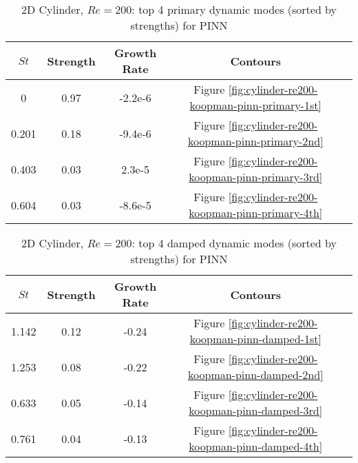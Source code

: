 \begin{table}[hbt!]
    \begin{threeparttable}[b]
        \begin{tabular}{ccccc}
            \toprule
            $St$ & Strength & Growth Rate & Contours \\
            \midrule
            0     & 0.97 & -2.2e-6  & Figure \ref{fig:cylinder-re200-koopman-pinn-primary-1st}\\
            0.201 & 0.18 & -9.4e-6  & Figure \ref{fig:cylinder-re200-koopman-pinn-primary-2nd}\\
            0.403 & 0.03 &  2.3e-5  & Figure \ref{fig:cylinder-re200-koopman-pinn-primary-3rd}\\
            0.604 & 0.03 & -8.6e-5  & Figure \ref{fig:cylinder-re200-koopman-pinn-primary-4th}\\
            \bottomrule
        \end{tabular}%
        \caption{%
            2D Cylinder, $Re=200$: top 4 primary dynamic modes (sorted by strengths) for PINN%
        }%
        \label{table:koopman-pinn-primary}
    \end{threeparttable}
\end{table}%

\begin{table}[hbt!]
    \begin{threeparttable}[b]
        \begin{tabular}{ccccc}
            \toprule
            $St$ & Strength & Growth Rate & Contours \\
            \midrule
            1.142 & 0.12 & -0.24 & Figure \ref{fig:cylinder-re200-koopman-pinn-damped-1st}\\
            1.253 & 0.08 & -0.22 & Figure \ref{fig:cylinder-re200-koopman-pinn-damped-2nd}\\
            0.633 & 0.05 & -0.14 & Figure \ref{fig:cylinder-re200-koopman-pinn-damped-3rd}\\
            0.761 & 0.04 & -0.13 & Figure \ref{fig:cylinder-re200-koopman-pinn-damped-4th}\\
            \bottomrule
        \end{tabular}%
        \caption{%
            2D Cylinder, $Re=200$: top 4 damped dynamic modes (sorted by strengths) for PINN%
        }%
        \label{table:koopman-pinn-damped}
    \end{threeparttable}
\end{table}%


